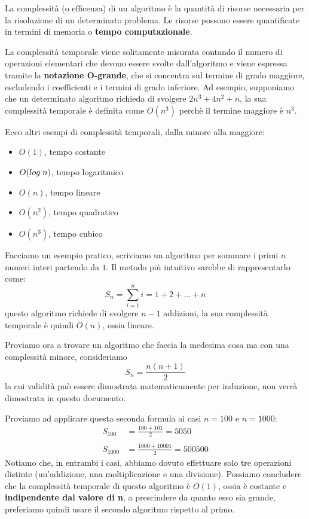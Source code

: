 \documentclass[../main.tex]{subfiles}
\begin{document}
La complessità (o efficenza) di un algoritmo è la quantità di risorse necessaria per la risoluzione di un determinato problema. Le risorse possono essere quantificate in termini di memoria o \textbf{tempo computazionale}.

La complessità temporale viene solitamente misurata contando il numero di operazioni elementari che devono essere svolte dall'algoritmo e viene espressa tramite la \textbf{notazione O-grande}, che si concentra sul termine di grado maggiore, escludendo i coefficienti e i termini di grado inferiore.
Ad esempio, supponiamo che un determinato algoritmo richieda di svolgere $2n^3+4n^2+n$, la sua complessità temporale è definita come $O(n^3)$ perchè il termine maggiore è $n^3$.

Ecco altri esempi di complessità temporali, dalla minore alla maggiore:
\begin{itemize}
    \item $O(1)$, tempo costante
    \item $O(log \space \phantom{.} n)$, tempo logaritmico
    \item $O(n)$, tempo lineare
    \item $O(n^2)$, tempo quadratico
    \item $O(n^3)$, tempo cubico
\end{itemize}
\vspace{0.5cm}
Facciamo un esempio pratico, scriviamo un algoritmo per sommare i primi $n$ numeri interi partendo da $1$. Il metodo più intuitivo sarebbe di rappresentarlo come:
$$
    S_n = \sum_{i=1}^{n} i = 1 + 2 + ... + n
$$
questo algoritmo richiede di svolgere $n-1$ addizioni, la sua complessità temporale è quindi $O(n)$, ossia lineare.

Proviamo ora a trovare un algoritmo che faccia la medesima cosa ma con una complessità minore, consideriamo
$$
    S_n = \frac{n(n+1)}{2}
$$
la cui validità può essere dimostrata matematicamente per induzione, non verrà dimostrata in questo documento.

Proviamo ad applicare questa seconda formula ai casi $n=100$ e $n=1000$:
\begin{align*}
    S_{100} &= \frac{100+101}{2} = 5050 \\ \\
    S_{1000} &= \frac{1000+10001}{2} = 500500
\end{align*}
Notiamo che, in entrambi i casi, abbiamo dovuto effettuare solo tre operazioni distinte (un'addizione, una moltiplicazione e una divisione). Possiamo concludere che la complessità temporale di questo algoritmo è $O(1)$, ossia è costante e \textbf{indipendente dal valore di n}, a prescindere da quanto esso sia grande, preferiamo quindi usare il secondo algoritmo rispetto al primo.
\end{document}
